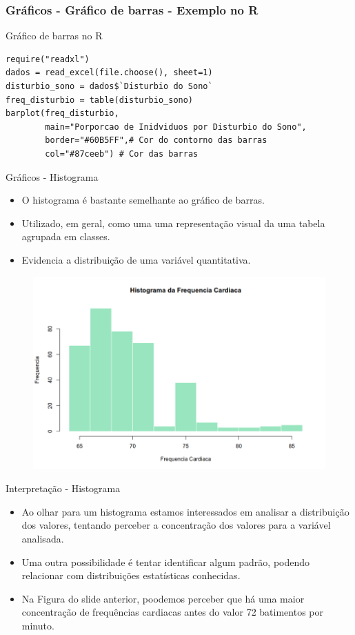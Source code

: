 \begin{frame}[fragile]
\frametitle{Gráficos - Gráfico de barras - Exemplo no R}
\begin{block}{Gráfico de barras no R}
\begin{verbatim}
require("readxl")
dados = read_excel(file.choose(), sheet=1) 
disturbio_sono = dados$`Disturbio do Sono`
freq_disturbio = table(disturbio_sono)
barplot(freq_disturbio, 
        main="Porporcao de Inidviduos por Disturbio do Sono",
        border="#60B5FF",# Cor do contorno das barras
        col="#87ceeb") # Cor das barras
\end{verbatim}
\end{block}
\end{frame}

\begin{frame}{Gráficos - Histograma}
    \begin{itemize}
        \item  O histograma é bastante semelhante ao gráfico de barras.
        \pause
        \item  Utilizado, em geral, como uma uma representação visual da uma tabela agrupada em classes. 
        \pause
        \item Evidencia a distribuição de uma variável quantitativa. 
    \end{itemize}
\pause

\begin{figure}
    \centering
    \includegraphics[width=0.8\linewidth]{figures/grafico_histograma.png}
\end{figure}
\end{frame}

\begin{frame}{Interpretação - Histograma}
    \begin{itemize}
        \item  Ao olhar para um histograma estamos interessados em analisar a distribuição dos valores, tentando
        perceber a concentração dos valores para a variável analisada.
        \pause
        \item Uma outra possibilidade é tentar identificar algum padrão, podendo relacionar com distribuições estatísticas conhecidas. 
        \item Na Figura do slide anterior, poodemos perceber que há uma maior concentração de frequências cardiacas antes do valor 72 batimentos por minuto.  
    \end{itemize}

\end{frame}

